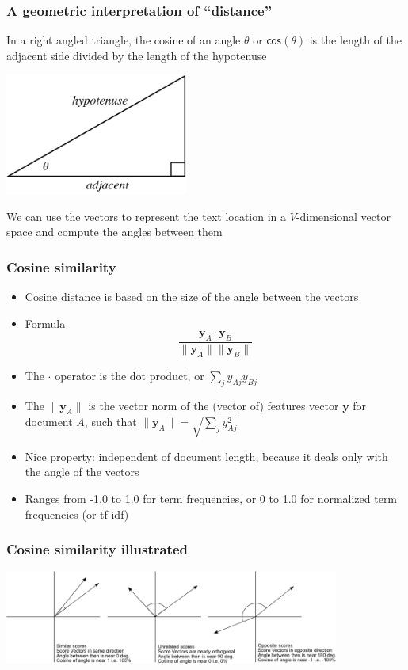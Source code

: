 \documentclass{beamer}
\begin{document}
\begin{frame}
	\frametitle{A geometric interpretation of ``distance''}
	In a right angled triangle, the cosine of an angle $\theta$ or
	$\mathsf{cos}(\theta)$ is the \alert{length of the adjacent side}
	divided by the \alert{length of the hypotenuse}
	\begin{center}
		\includegraphics[width=6cm]{figures/cosine.png}
	\end{center}
	
	We can use the vectors to represent the text location in a
	$V$-dimensional vector space and compute the angles between them
\end{frame}



\begin{frame}
	\frametitle{Cosine similarity}
	\begin{itemize}
		\item Cosine distance is based on the size of the angle between the vectors
		\item Formula
		\begin{equation}
		\frac{\mathbf{y}_{A} \cdot \mathbf{y}_{B}}{\| \mathbf{y}_{A}\| \| \mathbf{y}_{B}\| }
		\end{equation}
		\item The $\cdot$ operator is the dot product, or $\sum_{j}
		y_{Aj}y_{Bj}$
		\item The $\| \mathbf{y}_{A}\|$ is the vector norm of the (vector
		of) features vector $\mathbf{y}$
		for document $A$, such that $\| \mathbf{y}_{A}\| = \sqrt{\sum_j y_{Aj}^2}$
		\item \pause Nice property: independent of document length, because it
		deals only with the angle of the vectors
		\item Ranges from -1.0 to 1.0 for term frequencies, or 0 to 1.0 for
		normalized term frequencies (or tf-idf)
	\end{itemize}
\end{frame}

\begin{frame}
	\frametitle{Cosine similarity illustrated}
	\begin{center}
		\includegraphics[width=11cm]{figures/cosinesimilarity.png}
	\end{center}
\end{frame}
\end{document}
